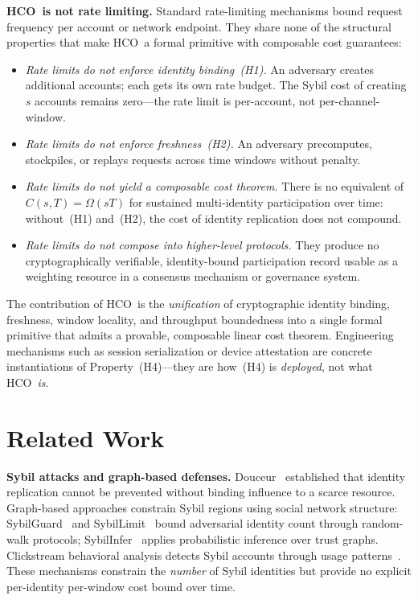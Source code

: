 \documentclass[11pt]{article}
\newcommand{\HCO}{HCO\xspace}
\theoremstyle{remark}
\theoremstyle{plain}
\begin{document}
	\noindent\textbf{\HCO\ is not rate limiting.}
	Standard rate-limiting mechanisms bound request frequency per account
	or network endpoint. They share none of the structural properties that
	make \HCO\ a formal primitive with composable cost guarantees:
	\begin{itemize}
		\item \emph{Rate limits do not enforce identity binding~(H1).}
		An adversary creates additional accounts; each gets its own rate
		budget. The Sybil cost of creating $s$ accounts remains
		zero---the rate limit is per-account, not per-channel-window.
		\item \emph{Rate limits do not enforce freshness~(H2).}
		An adversary precomputes, stockpiles, or replays requests across
		time windows without penalty.
		\item \emph{Rate limits do not yield a composable cost theorem.}
		There is no equivalent of $C(s,T) = \Omega(sT)$ for sustained
		multi-identity participation over time: without~(H1) and~(H2),
		the cost of identity replication does not compound.
		\item \emph{Rate limits do not compose into higher-level protocols.}
		They produce no cryptographically verifiable, identity-bound
		participation record usable as a weighting resource in a consensus
		mechanism or governance system.
	\end{itemize}
	The contribution of \HCO\ is the \emph{unification} of
	cryptographic identity binding, freshness, window locality, and
	throughput boundedness into a single formal primitive that admits a
	provable, composable linear cost theorem. Engineering mechanisms
	such as session serialization or device attestation are concrete
	instantiations of Property~(H4)---they are how~(H4) is
	\emph{deployed}, not what \HCO\ \emph{is}.
	
	
	\section{Related Work}
	\label{sec:related}
	
	\noindent\textbf{Sybil attacks and graph-based defenses.}
	Douceur~\cite{douceur2002sybil} established that identity replication
	cannot be prevented without binding influence to a scarce resource.
	Graph-based approaches constrain Sybil regions using social network
	structure: SybilGuard~\cite{yu2006sybilguard} and
	SybilLimit~\cite{yu2008sybillimit} bound adversarial identity count
	through random-walk protocols; SybilInfer~\cite{danezis2009sybilinfer}
	applies probabilistic inference over trust graphs. Clickstream
	behavioral analysis detects Sybil accounts through usage
	patterns~\cite{wang2013clickstream}. These mechanisms constrain the
	\emph{number} of Sybil identities but provide no explicit per-identity
	per-window cost bound over time.
	
\end{document}
